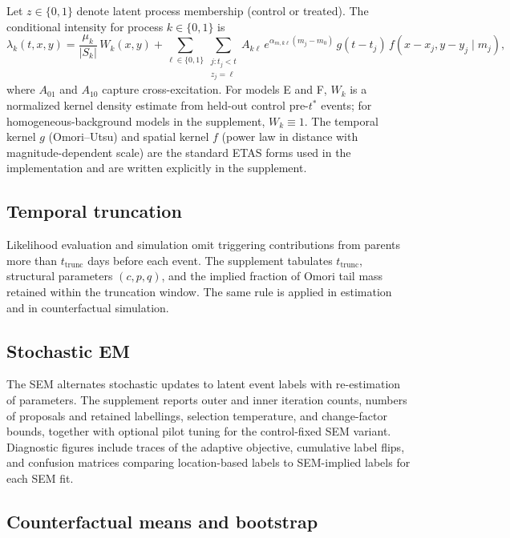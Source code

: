 Let $z \in \{0,1\}$ denote latent process membership (control or treated). The conditional intensity for process $k \in \{0,1\}$ is
\begin{equation*}
\lambda_k(t,x,y)
  = \frac{\mu_k}{|S_k|}\, W_k(x,y)
  + \sum_{\ell \in \{0,1\}} \sum_{\substack{j : t_j < t \\ z_j = \ell}}
    A_{k\ell}\, e^{\alpha_{m,k\ell}(m_j - m_0)}\,
    g(t - t_j)\, f(x-x_j, y-y_j \mid m_j),
\end{equation*}
where $A_{01}$ and $A_{10}$ capture cross-excitation. For models E and F, $W_k$ is a normalized kernel density estimate from held-out control pre-$t^*$ events; for homogeneous-background models in the supplement, $W_k \equiv 1$. The temporal kernel $g$ (Omori--Utsu) and spatial kernel $f$ (power law in distance with magnitude-dependent scale) are the standard ETAS forms used in the implementation and are written explicitly in the supplement.

\subsection{Temporal truncation}

Likelihood evaluation and simulation omit triggering contributions from parents more than $t_{\mathrm{trunc}}$ days before each event. The supplement tabulates $t_{\mathrm{trunc}}$, structural parameters $(c,p,q)$, and the implied fraction of Omori tail mass retained within the truncation window. The same rule is applied in estimation and in counterfactual simulation.

\subsection{Stochastic EM}

The SEM alternates stochastic updates to latent event labels with re-estimation of parameters. The supplement reports outer and inner iteration counts, numbers of proposals and retained labellings, selection temperature, and change-factor bounds, together with optional pilot tuning for the control-fixed SEM variant. Diagnostic figures include traces of the adaptive objective, cumulative label flips, and confusion matrices comparing location-based labels to SEM-implied labels for each SEM fit.

\subsection{Counterfactual means and bootstrap}


